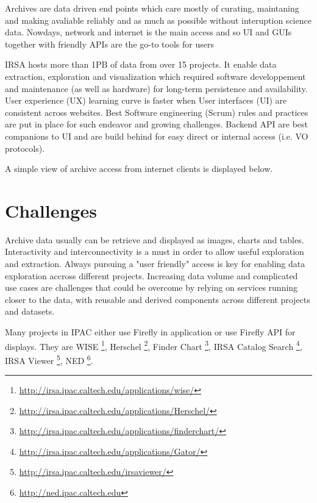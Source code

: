 \documentclass[11pt,twoside]{article}
\begin{document}
Archives are data driven end points which care mostly of curating, maintaning and making avaliable reliably and as much as possible without interuption science data.
Nowdays, network and internet is the main access and so UI and GUIs together with friendly APIs are the go-to tools for users

IRSA hosts more than 1PB of data from over 15 projects. It enable data extraction, exploration and visualization which required software developpement and maintenance (as well as hardware) for long-term persistence and availability.
User experience (UX) learning curve is faster when User interfaces (UI) are consistent across websites.
Best Software engineering (Scrum) rules and practices are put in place for such endeavor and growing challenges.
Backend API are best companions to UI and are build behind for easy direct or internal access (i.e. VO protocols).

A simple view of archive access from internet clients is displayed below.




\section{Challenges}

Archive data usually can be retrieve and displayed as images, charts and tables.
Interactivity and interconnectivity is a must in order to allow useful exploration and extraction.
Always pursuing a "user friendly" access is key for enabling data exploration accross different projects.
Increasing data volume and complicated use cases are challenges that could be overcome by relying on services running closer to the data, with
reusable and derived components across different projects and datasets.

Many projects in IPAC either  use Firefly  in application or use Firefly API for displays.
They are WISE \footnote{\url{http://irsa.ipac.caltech.edu/applications/wise/}},
Herschel \footnote{\url{http://irsa.ipac.caltech.edu/applications/Herschel/}},
Finder Chart \footnote{\url{http://irsa.ipac.caltech.edu/applications/finderchart/}},
IRSA Catalog Search \footnote{\url{http://irsa.ipac.caltech.edu/applications/Gator/}},
IRSA Viewer \footnote{\url{http://irsa.ipac.caltech.edu/irsaviewer/}},
NED \footnote{\url{http://ned.ipac.caltech.edu}}.
\end{document}
